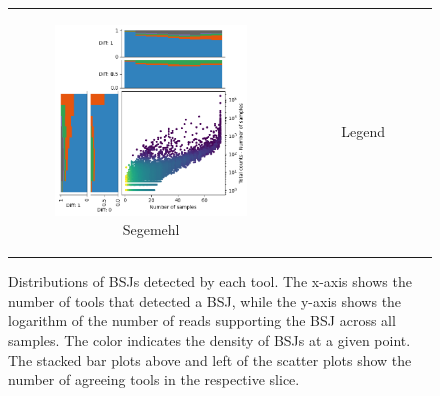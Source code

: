 \begin{figure}[ht]
\begin{tabular}{cc}
\begin{subfigure}{.4\textwidth}
            \includegraphics[width=\linewidth]{chapters/4_results_and_discussion/figures/detection/density/segemehl.png}
            \caption{Segemehl}
            \label{fig:detection_density_segemehl}
        \end{subfigure}
         &
        \begin{subfigure}{.4\textwidth}
            \centering
            \caption{Legend}
        \end{subfigure}
    \end{tabular}
    \caption{Distributions of BSJs detected by each tool.
        The x-axis shows the number of tools that detected a BSJ, while the y-axis
        shows the logarithm of the number of reads supporting the BSJ across all
        samples.
        The color indicates the density of BSJs at a given point.
        The stacked bar plots above and left of the scatter plots show the number of
        agreeing tools in the respective slice.
    }
    \label{fig:detection_density}
\end{figure}
